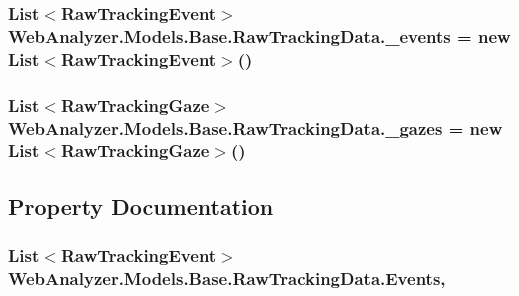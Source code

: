 \subsubsection[{\+\_\+events}]{\setlength{\rightskip}{0pt plus 5cm}List$<${\bf Raw\+Tracking\+Event}$>$ Web\+Analyzer.\+Models.\+Base.\+Raw\+Tracking\+Data.\+\_\+events = new List$<${\bf Raw\+Tracking\+Event}$>$()\hspace{0.3cm}{\ttfamily [private]}}\label{class_web_analyzer_1_1_models_1_1_base_1_1_raw_tracking_data_ab00b8549401b2116e14913d21c271322}
\hypertarget{class_web_analyzer_1_1_models_1_1_base_1_1_raw_tracking_data_a74e9bb3eb14735e880cb53a28483538a}{}
\subsubsection[{\+\_\+gazes}]{\setlength{\rightskip}{0pt plus 5cm}List$<${\bf Raw\+Tracking\+Gaze}$>$ Web\+Analyzer.\+Models.\+Base.\+Raw\+Tracking\+Data.\+\_\+gazes = new List$<${\bf Raw\+Tracking\+Gaze}$>$()\hspace{0.3cm}{\ttfamily [private]}}\label{class_web_analyzer_1_1_models_1_1_base_1_1_raw_tracking_data_a74e9bb3eb14735e880cb53a28483538a}


\subsection{Property Documentation}
\hypertarget{class_web_analyzer_1_1_models_1_1_base_1_1_raw_tracking_data_a288234f675cdfe067ec0667aa2be36c3}{}
\subsubsection[{Events}]{\setlength{\rightskip}{0pt plus 5cm}List$<${\bf Raw\+Tracking\+Event}$>$ Web\+Analyzer.\+Models.\+Base.\+Raw\+Tracking\+Data.\+Events\hspace{0.3cm}{\ttfamily [get]}, {\ttfamily [set]}}\label{class_web_analyzer_1_1_models_1_1_base_1_1_raw_tracking_data_a288234f675cdfe067ec0667aa2be36c3}
\hypertarget{class_web_analyzer_1_1_models_1_1_base_1_1_raw_tracking_data_a709969dfa88f800747d1bbabbdfb334e}{}
